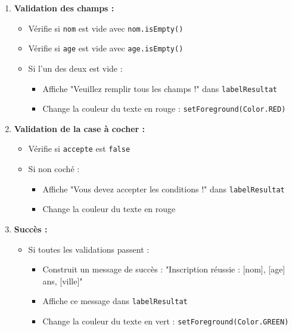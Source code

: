 \documentclass[11pt,a4paper]{article}
\begin{document}
\begin{correctionbox}
\begin{enumerate}
\begin{enumerate}
        \item \textbf{Validation des champs :}
        \begin{itemize}
            \item Vérifie si \texttt{nom} est vide avec \texttt{nom.isEmpty()}
            \item Vérifie si \texttt{age} est vide avec \texttt{age.isEmpty()}
            \item Si l'un des deux est vide :
            \begin{itemize}
                \item Affiche "Veuillez remplir tous les champs !" dans \texttt{labelResultat}
                \item Change la couleur du texte en rouge : \texttt{setForeground(Color.RED)}
            \end{itemize}
        \end{itemize}
        
        \item \textbf{Validation de la case à cocher :}
        \begin{itemize}
            \item Vérifie si \texttt{accepte} est \texttt{false}
            \item Si non coché :
            \begin{itemize}
                \item Affiche "Vous devez accepter les conditions !" dans \texttt{labelResultat}
                \item Change la couleur du texte en rouge
            \end{itemize}
        \end{itemize}
        
        \item \textbf{Succès :}
        \begin{itemize}
            \item Si toutes les validations passent :
            \begin{itemize}
                \item Construit un message de succès : "Inscription réussie : [nom], [age] ans, [ville]"
                \item Affiche ce message dans \texttt{labelResultat}
                \item Change la couleur du texte en vert : \texttt{setForeground(Color.GREEN)}
            \end{itemize}
        \end{itemize}
    \end{enumerate}
    

\end{enumerate}
\end{correctionbox}
\end{document}
